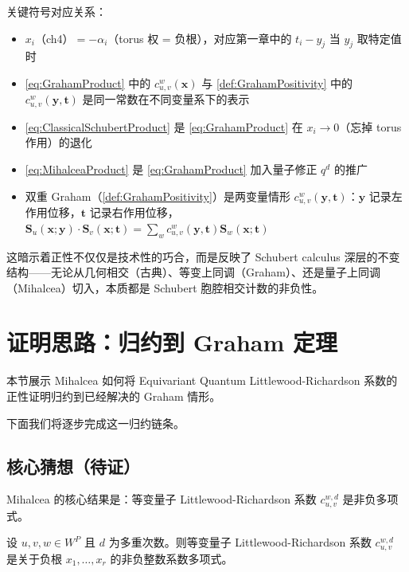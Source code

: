 关键符号对应关系：
\begin{sloppypar}
\begin{itemize}
\item $x_i$（ch4）$= -\alpha_i$（torus 权 = 负根），对应第一章中的 $t_i - y_j$ 当 $y_j$ 取特定值时
\item \eqref{eq:GrahamProduct} 中的 $c_{u,v}^w(\mathbf{x})$ 与 \cref{def:GrahamPositivity} 中的 $c^w_{u,v}(\mathbf{y},\mathbf{t})$ 是同一常数在不同变量系下的表示
\item \eqref{eq:ClassicalSchubertProduct} 是 \eqref{eq:GrahamProduct} 在 $x_i \to 0$（忘掉 torus 作用）的退化
\item \eqref{eq:MihalceaProduct} 是 \eqref{eq:GrahamProduct} 加入量子修正 $q^d$ 的推广
\item 双重 Graham（\cref{def:GrahamPositivity}）是两变量情形 $c_{u,v}^w(\mathbf{y},\mathbf{t})$：$\mathbf{y}$ 记录左作用位移，$\mathbf{t}$ 记录右作用位移，$\mathbf{S}_u(\mathbf{x};\mathbf{y}) \cdot \mathbf{S}_v(\mathbf{x};\mathbf{t}) = \sum_w c_{u,v}^w(\mathbf{y},\mathbf{t}) \mathbf{S}_w(\mathbf{x};\mathbf{t})$
\end{itemize}
\end{sloppypar}

这暗示着正性不仅仅是技术性的巧合，而是反映了 Schubert calculus 深层的不变结构——无论从几何相交（古典）、等变上同调（Graham）、还是量子上同调（Mihalcea）切入，本质都是 Schubert 胞腔相交计数的非负性。

\section{证明思路：归约到 Graham 定理}
\label{sec:ProofOutlineCh4}

本节展示 Mihalcea 如何将 Equivariant Quantum Littlewood-Richardson 系数的正性证明归约到已经解决的 Graham 情形。

下面我们将逐步完成这一归约链条。

\subsection{核心猜想（待证）}
\label{sec:CoreConjectureCh4}

Mihalcea 的核心结果是：等变量子 Littlewood-Richardson 系数 $c_{u,v}^{w,d}$ 是非负多项式。

\begin{Theorem}
\label{th:EQCPositivityCh4-Statement}
设 $u, v, w \in W^P$ 且 $d$ 为多重次数。则等变量子 Littlewood-Richardson 系数 $c_{u,v}^{w,d}$ 是关于负根 $x_1, \ldots, x_r$ 的非负整数系数多项式。
\end{Theorem}


